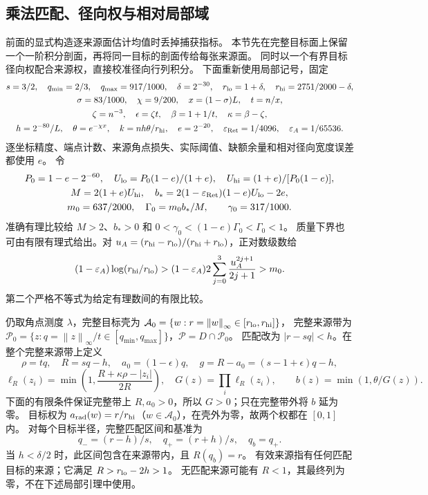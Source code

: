 \documentclass[UTF8,a4paper,11pt,fontset=fandol]{ctexart}
\theoremstyle{remark}
\newcommand{\norm}[1]{\left\lVert#1\right\rVert}
\begin{document}
\subsection{乘法匹配、径向权与相对局部域}\label{subsec:relative-parameters}
前面的显式构造逐来源面估计均值时丢掉捕获指标。
本节先在完整目标面上保留一个一阶积分剖面，再将同一目标的剖面传给每张来源面。
同时以一个有界目标径向权配合来源权，直接校准径向行列积分。
下面重新使用局部记号，固定
\begin{equation}\label{eq:profile-tuple}
\begin{gathered}
 s=3/2,\quad q_{\min}=2/3,\quad q_{\max}=917/1000,\quad
 \delta=2^{-30},\quad r_{\rm lo}=1+\delta,\quad r_{\rm hi}=2751/2000-\delta,\\
 \sigma=83/1000,\quad\chi=9/200,\quad x=(1-\sigma)L,\quad t=n/x,\\
 \zeta=n^{-3},\quad\epsilon=\zeta t,\quad\beta=1+1/t,\quad\kappa=\beta-\zeta,\\
 h=2^{-80}/L,\quad\theta=e^{-\chi x},\quad k=nh\theta/r_{\rm hi},\quad
 e=2^{-20},\quad\varepsilon_{\rm Ret}=1/4096,\quad\varepsilon_A=1/65536.
\end{gathered}
\end{equation}
逐坐标精度、端点计数、来源角点损失、实际阈值、缺额余量和相对径向宽度误差都使用 $e$。
令
\begin{equation}\label{eq:profile-budget}
\begin{gathered}
 P_0=1-e-2^{-60},\quad U_{\rm lo}=P_0(1-e)/(1+e),\quad
 U_{\rm hi}=(1+e)/[P_0(1-e)],\\
 M=2(1+e)U_{\rm hi},\quad
 b_*=2(1-\varepsilon_{\rm Ret})(1-e)U_{\rm lo}-2e,\\
 m_0=637/2000,\quad\Gamma_0=m_0b_*/M,\qquad\gamma_0=317/1000.
\end{gathered}
\end{equation}
准确有理比较给 $M>2$、$b_*>0$ 和
$0<\gamma_0<(1-e)\Gamma_0<\Gamma_0<1$。
质量下界也可由有限有理式给出。对
$u_A=(r_{\rm hi}-r_{\rm lo})/(r_{\rm hi}+r_{\rm lo})$，正对数级数给
\begin{equation}\label{eq:profile-mass-certificate}
 (1-\varepsilon_A)\log(r_{\rm hi}/r_{\rm lo})
 >(1-\varepsilon_A)2\sum_{j=0}^{3}\frac{u_A^{2j+1}}{2j+1}>m_0.
\end{equation}
第二个严格不等式为给定有理数间的有限比较。

仍取角点测度 $\lambda$，完整目标壳为 $\mathcal A_0=\{w:r=\norm w_\infty\in[r_{\rm lo},r_{\rm hi}]\}$，
完整来源带为 $\mathcal P_0=\{z:q=\norm z_\infty/t\in[q_{\min},q_{\max}]\}$，$\mathcal P=D\cap\mathcal P_0$。
匹配改为 $|r-sq|<h$。在整个完整来源带上定义
\[
 \rho=tq,\quad R=sq-h,\quad a_0=(1-\epsilon)q,
 \quad g=R-a_0=(s-1+\epsilon)q-h,
\]
\[
 \ell_R(z_i)=\min\left(1,\frac{R+\kappa\rho-|z_i|}{2R}\right),\quad
 G(z)=\prod_i\ell_R(z_i),\qquad b(z)=\min(1,\theta/G(z)).
\]
下面的有限条件保证完整带上 $R,a_0>0$，所以 $G>0$；只在完整带外将 $b$ 延为零。
目标权为 $a_{\rm rad}(w)=r/r_{\rm hi}$（$w\in\mathcal A_0$），在壳外为零，故两个权都在 $[0,1]$ 内。
对每个目标半径，完整匹配区间和基准为
\[
 q_-=(r-h)/s,\quad q_+=(r+h)/s,\quad q_b=q_+.
\]
当 $h<\delta/2$ 时，此区间包含在来源带内，且 $R(q_b)=r$。
有效来源指有任何匹配目标的来源；它满足 $R>r_{\rm lo}-2h>1$。
无匹配来源可能有 $R<1$，其最终列为零，不在下述局部引理中使用。
\end{document}
